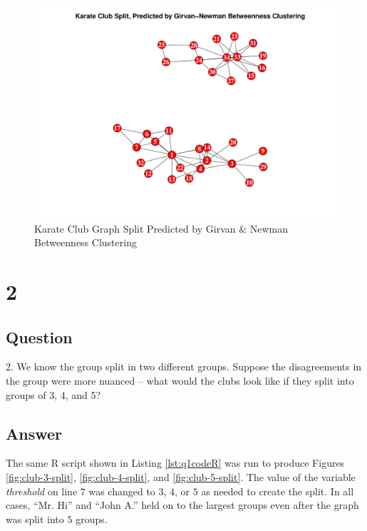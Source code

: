 \documentclass[letterpaper,11pt]{article}
\begin{document}
\clearpage
\begin{figure}[h]
\includegraphics[scale=0.5]{club-after.pdf}
\caption{Karate Club Graph Split Predicted by Girvan \& Newman Betweenness Clustering}
\label{fig:club-after}
\end{figure}

\clearpage


\newpage


\section*{2}

\subsection*{Question}

2.  We know the group split in two different groups.  Suppose the
disagreements in the group were more nuanced -- what would the clubs
look like if they split into groups of 3, 4, and 5?


\subsection*{Answer}

The same R script shown in Listing \ref{lst:q1codeR} was run to produce Figures \ref{fig:club-3-split}, \ref{fig:club-4-split}, and \ref{fig:club-5-split}.  The value of the variable \emph{threshold} on line $7$ was changed to $3$, $4$, or $5$ as needed to create the split.  In all cases, ``Mr. Hi'' and ``John A.'' held on to the largest groups even after the graph was split into $5$ groups.
\end{document}
